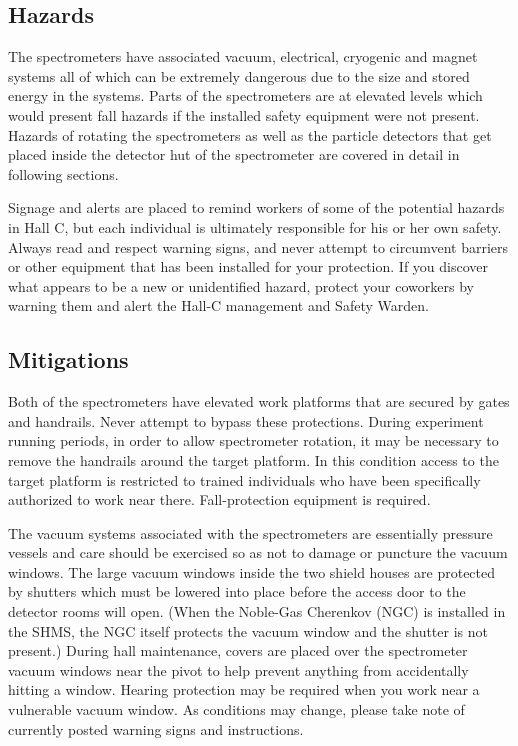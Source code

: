 \begin{safetyen}{0}{0}
\label{sec:spectrometer-safety}

\subsection{Hazards}

The spectrometers have associated vacuum, electrical, cryogenic and
magnet systems all of which can be extremely dangerous due to the size
and stored energy in the systems.
Parts of the spectrometers are at elevated levels which would present fall
hazards if the installed safety equipment were not present.
Hazards of rotating the
spectrometers as well as the particle detectors that get placed inside
the detector hut of the spectrometer are covered in detail in
following sections.

Signage and alerts are placed to remind workers of some of the potential hazards
in Hall C, but each individual is ultimately responsible for his or her own
safety. Always read and respect warning signs, and never attempt to
circumvent barriers or other equipment
that has been installed for your protection. If you discover what appears to be a
new or unidentified hazard, protect your coworkers by warning them
and alert the Hall-C management and Safety Warden.

\subsection{Mitigations}

Both of the spectrometers have elevated work platforms that are secured by
gates and handrails. Never attempt to bypass these protections. During experiment
running periods, in order to allow spectrometer rotation, it may be necessary to
remove the handrails around the target platform. In this condition access to the
target platform is restricted to trained individuals who have been specifically
authorized to work near there. Fall-protection equipment is required.

The vacuum systems associated with the spectrometers are essentially
pressure vessels and care should be exercised so as not to damage or puncture the
vacuum windows.   The large vacuum windows inside the two shield houses are protected
by shutters which must be lowered into place before the access door to the
detector rooms will open. (When the Noble-Gas Cherenkov (NGC) is installed in the SHMS,
the NGC itself protects the vacuum window and the shutter is not present.)
During hall maintenance, covers are placed over the spectrometer
vacuum windows near the pivot to help prevent anything from accidentally hitting
a window. Hearing protection may be required when you work near a vulnerable
vacuum window. As conditions may change, please take note of currently posted
warning signs and instructions.


\end{safetyen}
